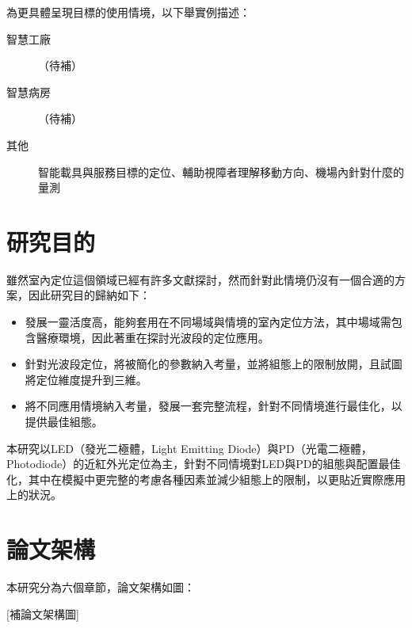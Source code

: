 為更具體呈現目標的使用情境，以下舉實例描述：
\begin{description}
    \item[智慧工廠] （待補）
    \item[智慧病房] （待補）
    \item[其他]  
    智能載具與服務目標的定位、輔助視障者理解移動方向、機場內針對什麼的量測 
\end{description}






\section{研究目的}

雖然室內定位這個領域已經有許多文獻探討，然而針對此情境仍沒有一個合適的方案，因此研究目的歸納如下：


\begin{itemize} 
    \item 發展一靈活度高，能夠套用在不同場域與情境的室內定位方法，其中場域需包含醫療環境，因此著重在探討光波段的定位應用。  
    \item 針對光波段定位，將被簡化的參數納入考量，並將組態上的限制放開，且試圖將定位維度提升到三維。
    \item 將不同應用情境納入考量，發展一套完整流程，針對不同情境進行最佳化，以提供最佳組態。
\end{itemize}


本研究以LED（發光二極體，Light Emitting Diode）與PD（光電二極體，Photodiode）的近紅外光定位為主，針對不同情境對LED與PD的組態與配置最佳化，其中在模擬中更完整的考慮各種因素並減少組態上的限制，以更貼近實際應用上的狀況。






\section{論文架構}
本研究分為六個章節，論文架構如圖：

[補論文架構圖]

